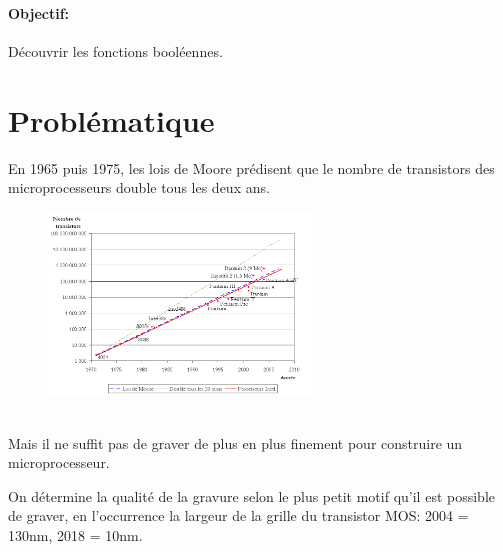 \documentclass[a4paper,11pt]{article}
\begin{document}
\begin{Form}
\paragraph{Objectif:}Découvrir les fonctions booléennes.
\section{Problématique}
En 1965 puis 1975, les lois de Moore prédisent que le nombre de transistors des microprocesseurs double tous les deux ans.
\begin{figure}[!h]
\centering
\includegraphics[width=7cm]{ressources/loi-moore.png}
\label{moore}
\end{figure}
\\Mais il ne suffit pas de graver de plus en plus finement pour construire un microprocesseur.
\begin{commentprof}
On détermine la qualité de la gravure selon le plus petit motif qu'il est possible de graver, en l'occurrence la largeur de la grille du transistor MOS: 2004 = 130nm, 2018 = 10nm.
\end{commentprof}
\begin{center}
\end{center}

\end{Form}
\end{document}
